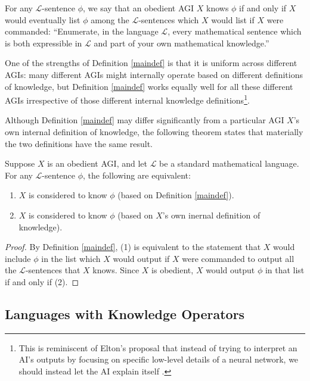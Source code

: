 \documentclass[runningheads]{llncs}
\begin{document}
\begin{definition}
\label{maindef}
  For any $\mathscr L$-sentence $\phi$, we say that an
  obedient AGI $X$ knows $\phi$ if and only
  if $X$ would eventually list $\phi$ among the $\mathscr L$-sentences which $X$
  would list if $X$ were commanded:
  ``Enumerate, in the language $\mathscr L$, every mathematical sentence which
  is both expressible in $\mathscr L$ and part of your own mathematical knowledge.''
\end{definition}

One of the strengths of Definition \ref{maindef} is that it is uniform across
different AGIs: many different AGIs might internally operate based on different
definitions of knowledge, but Definition \ref{maindef} works equally well for
all these different AGIs irrespective of those different internal knowledge
definitions\footnote{This is reminiscent of Elton's proposal that instead of
trying to interpret an AI's outputs by focusing on specific low-level details
of a neural network, we should instead let the AI explain itself \cite{elton}.}.

Although Definition \ref{maindef} may differ significantly from a particular AGI
$X$'s own internal definition of knowledge, the following theorem states that
materially the two definitions have the same result.

\begin{theorem}
\label{sentenceequivalence}
  Suppose $X$ is an obedient AGI, and let $\mathscr L$
  be a standard mathematical language. For any $\mathscr L$-sentence $\phi$, the following
  are equivalent:
  \begin{enumerate}
    \item $X$ is
    considered to know $\phi$ (based on Definition \ref{maindef}).
    \item
    $X$ is considered to know $\phi$ (based on $X$'s own inernal definition of
    knowledge).
  \end{enumerate}
\end{theorem}

\begin{proof}
  By Definition \ref{maindef}, (1) is equivalent to the statement that $X$ would
  include $\phi$ in the list which $X$ would output if $X$ were commanded to output
  all the $\mathscr L$-sentences that $X$ knows. Since $X$ is obedient, $X$ would output
  $\phi$ in that list if and only if (2).
\end{proof}

\subsection{Languages with Knowledge Operators}
\end{document}
